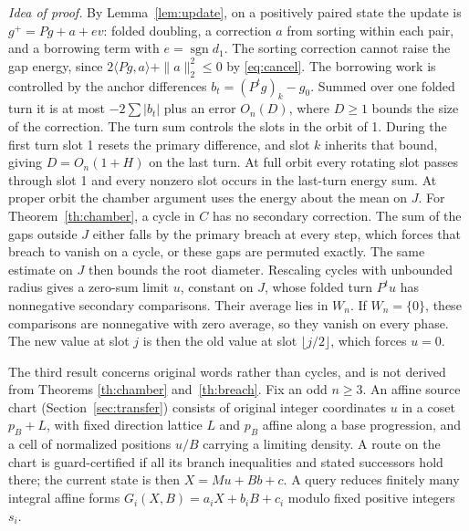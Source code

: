 \documentclass[11pt,reqno]{amsart}
\theoremstyle{definition}
\newcommand{\sgn}{\operatorname{sgn}}
\begin{document}
\emph{Idea of proof.} By Lemma~\ref{lem:update}, on a positively paired state the update is \(g^+=Pg+a+ev\): folded doubling, a correction \(a\) from sorting within each pair, and a borrowing term with \(e=\sgn d_1\). The sorting correction cannot raise the gap energy, since \(2\langle Pg,a\rangle+\|a\|_2^2\le0\) by \eqref{eq:cancel}. The borrowing work is controlled by the anchor differences \(b_t=(P^tg)_k-g_0\). Summed over one folded turn it is at most \(-2\sum|b_t|\) plus an error \(O_n(D)\), where \(D\ge1\) bounds the size of the correction. The turn sum controls the slots in the orbit of 1. During the first turn slot 1 resets the primary difference, and slot \(k\) inherits that bound, giving \(D=O_n(1+H)\) on the last turn. At full orbit every rotating slot passes through slot 1 and every nonzero slot occurs in the last-turn energy sum. At proper orbit the chamber argument uses the energy about the mean on \(J\). For Theorem~\ref{th:chamber}, a cycle in \(C\) has no secondary correction. The sum of the gaps outside \(J\) either falls by the primary breach at every step, which forces that breach to vanish on a cycle, or these gaps are permuted exactly. The same estimate on \(J\) then bounds the root diameter. Rescaling cycles with unbounded radius gives a zero-sum limit \(u\), constant on \(J\), whose folded turn \(P^tu\) has nonnegative secondary comparisons. Their average lies in \(W_n\). If \(W_n=\{0\}\), these comparisons are nonnegative with zero average, so they vanish on every phase. The new value at slot \(j\) is then the old value at slot \(\lfloor j/2\rfloor\), which forces \(u=0\).

The third result concerns original words rather than cycles, and is not derived from Theorems \ref{th:chamber} and~\ref{th:breach}. Fix an odd \(n\ge3\). An affine source chart (Section~\ref{sec:transfer}) consists of original integer coordinates \(u\) in a coset \(p_B+L\), with fixed direction lattice \(L\) and \(p_B\) affine along a base progression, and a cell of normalized positions \(u/B\) carrying a limiting density. A route on the chart is guard-certified if all its branch inequalities and stated successors hold there; the current state is then \(X=Mu+Bb+c\). A query reduces finitely many integral affine forms \(G_i(X,B)=a_iX+b_iB+c_i\) modulo fixed positive integers \(s_i\).
\end{document}
